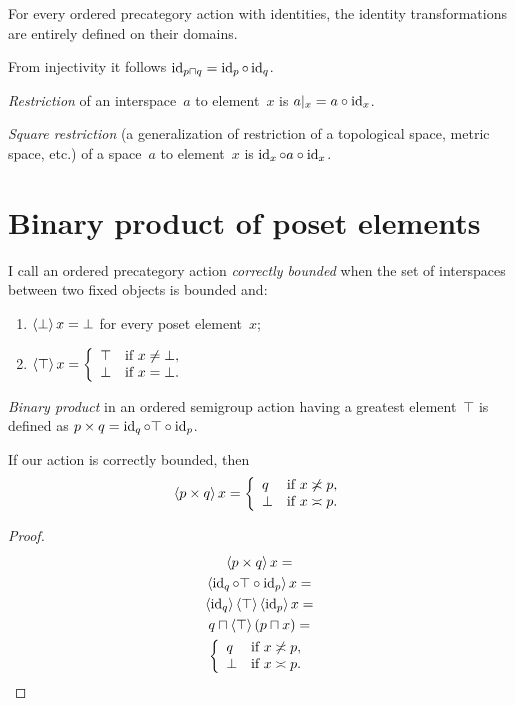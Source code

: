 \begin{obvious}
For every ordered precategory action with identities, the identity transformations are entirely defined on their domains.
\end{obvious}

From injectivity it follows $\operatorname{id}_{p\sqcap q} = \operatorname{id}_p\circ\operatorname{id}_q$.

\emph{Restriction} of an interspace~$a$ to element~$x$ is $a|_x=a\circ\operatorname{id}_x$.

\emph{Square restriction} (a generalization of restriction of a topological space, metric space, etc.) of a space~$a$ to element~$x$ is $\operatorname{id}_x\circ a\circ\operatorname{id}_x$.

\chapter{Binary product of poset elements}

\begin{defn}
I call an ordered precategory action \emph{correctly bounded} when the set of interspaces between two fixed objects is bounded and:
\begin{enumerate}
\item $\left\langle \bot\right\rangle x = \bot$ for every poset element~$x$;
\item $\left\langle \top\right\rangle x =
\left\{\begin{array}{ll}\top&\text{if }x\ne\bot,\\\bot&\text{if }x=\bot.\end{array}\right.$
\end{enumerate}
\end{defn}

\emph{Binary product} in an ordered semigroup action having a greatest element~$\top$ is defined as $p\times q=\operatorname{id}_q\circ\top\circ\operatorname{id}_p$.

\begin{thm}
If our action is correctly bounded, then
\[
\left\langle p\times q\right\rangle x =
\left\{\begin{array}{ll}q&\text{if }x\not\asymp p,\\\bot&\text{if }x\asymp p.\end{array}\right.
\]
\end{thm}

\begin{proof}
\begin{multline*}
\left\langle p\times q\right\rangle x = \\
\left\langle \operatorname{id}_q\circ\top\circ\operatorname{id}_p\right\rangle x = \\
\left\langle \operatorname{id}_q\right\rangle\left\langle \top\right\rangle\left\langle \operatorname{id}_p\right\rangle x = \\
q\sqcap\left\langle \top\right\rangle(p\sqcap x) = \\
\left\{\begin{array}{ll}q&\text{if }x\not\asymp p,\\\bot&\text{if }x\asymp p.\end{array}\right.
\end{multline*}
\end{proof}

